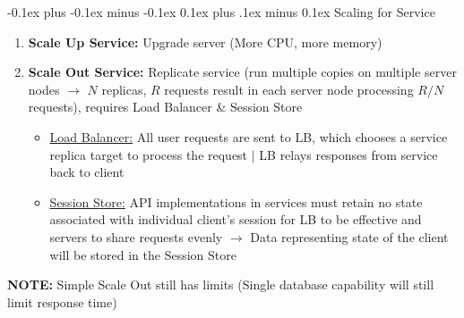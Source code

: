\documentclass[landscape]{article}
\makeatletter
\renewcommand{\subsection}{\@startsection{subsection}{2}{0mm}%
  {-0.1ex plus -0.1ex minus -0.1ex}%
  {0.1ex plus .1ex minus 0.1ex}%
{\normalfont\scriptsize\bfseries}}
\makeatother
\begin{document}
\begin{multicols*}{5}
    \subsection{Scaling for Service}
    \begin{enumerate}
      \item \textbf{Scale Up Service:} Upgrade server (More CPU, more memory)
      \item \textbf{Scale Out Service:} Replicate service (run multiple copies on multiple server nodes $\rightarrow$ $N$ replicas, $R$ requests result in each server node processing $R/N$ requests), requires Load Balancer \& Session Store
      \begin{itemize}
        \item \underline{Load Balancer:} All user requests are sent to LB, which chooses a service replica target to process the request $|$ LB relays responses from service back to client
        \item \underline{Session Store:} API implementations in services must retain no state associated with individual client's session for LB to be effective and servers to share requests evenly $\rightarrow$ Data representing state of the client will be stored in the Session Store
      \end{itemize}
    \end{enumerate}
    \textbf{NOTE:} Simple Scale Out still has limits (Single database capability will still limit response time)


\end{multicols*}
\end{document}
